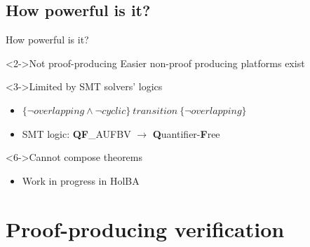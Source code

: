 \documentclass[xcolor={x11names}]{beamer}
\newcommand{\htriple}[3]{\ensuremath{\{#1\}~#2~\{#3\}}}
\begin{document}
\subsection{How powerful is it?}

\begin{frame}{How powerful is it?}
    \begin{block}<2->{Not proof-producing}
        Easier non-proof producing platforms exist
    \end{block}
    \begin{block}<3->{Limited by SMT solvers' logics}
        \begin{itemize}
            \item<4-> \htriple{\neg overlapping \land \neg cyclic}{transition}{\neg overlapping}
            \item<5-> SMT logic: \textbf{QF}\_AUFBV $\rightarrow$ \textbf{Q}uantifier-\textbf{F}ree
        \end{itemize}
    \end{block}
    \begin{block}<6->{Cannot compose theorems}
        \begin{itemize}
            \item<7-> Work in progress in HolBA
        \end{itemize}
    \end{block}
\end{frame}

\section{Proof-producing verification}
\end{document}
